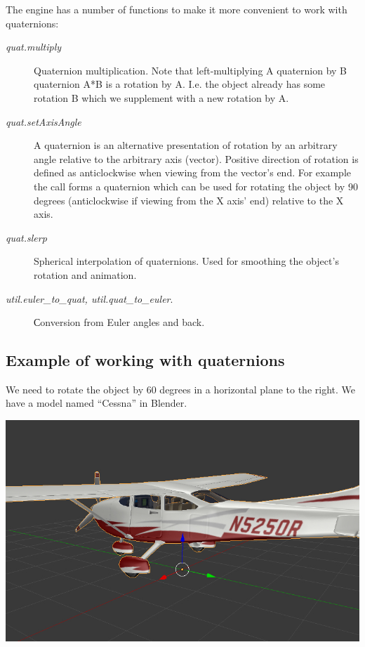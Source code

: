 \documentclass[a4paper,12pt,oneside]{sphinxmanual}
\begin{document}
The engine has a number of functions to make it more convenient to work with quaternions:
\begin{description}
\item[{\emph{quat.multiply}}] \leavevmode
Quaternion multiplication. Note that left-multiplying A quaternion by B quaternion A*B is a rotation by A. I.e. the object already has some rotation B which we supplement with a new rotation by A.

\item[{\emph{quat.setAxisAngle}}] \leavevmode
A quaternion is an alternative presentation of rotation by an arbitrary angle relative to the arbitrary axis (vector). Positive direction of rotation is defined as anticlockwise when viewing from the vector's end. For example the  call forms a quaternion which can be used for rotating the object by 90 degrees (anticlockwise if viewing from the X axis' end) relative to the X axis.

\item[{\emph{quat.slerp}}] \leavevmode
Spherical interpolation of quaternions. Used for smoothing the object's rotation and animation.

\item[{\emph{util.euler\_to\_quat, util.quat\_to\_euler}.}] \leavevmode
Сonversion from Euler angles and back.

\end{description}


\subsection{Example of working with quaternions}
\label{developers:id7}
We need to rotate the object by 60 degrees in a horizontal plane to the right. We have a model named ``Cessna'' in Blender.

{\hfill\includegraphics[width=1.000\linewidth]{aircraft.jpg}\hfill}
\end{document}
